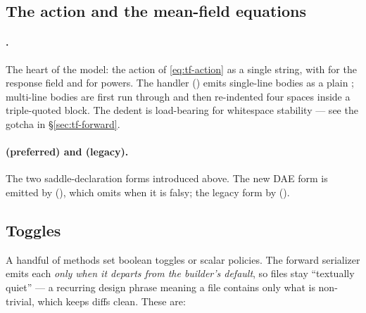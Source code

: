 \subsection{The action and the mean-field equations}

\paragraph{.} The heart of the model: the \msrjd{}
action of \eqref{eq:tf-action} as a single string, with  for the
response field and \code{\^{}} for powers. The handler 
() emits single-line bodies as a plain
; multi-line bodies are first run through  and
then re-indented four spaces inside a triple-quoted block. The dedent is
load-bearing for whitespace stability --- see the gotcha in \S\ref{sec:tf-forward}.

\paragraph{ (preferred) and
 (legacy).} The two saddle-declaration
forms introduced above. The new DAE form is emitted by 
(), which omits  when it
is falsy; the legacy form by 
().

\subsection{Toggles}

A handful of methods set boolean toggles or scalar policies. The forward
serializer emits each \emph{only when it departs from the builder's default}, so
files stay ``textually quiet'' --- a recurring design phrase meaning a file
contains only what is non-trivial, which keeps diffs clean. These are:

